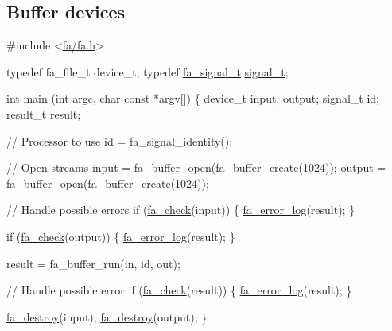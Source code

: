 \hypertarget{md__devices_id11127283}{}\subsection{Buffer devices}\label{md__devices_id11127283}

\begin{DoxyCode}
\textcolor{preprocessor}{#include <\hyperlink{fa_2fa_8h}{fa/fa.h}>}

\textcolor{keyword}{typedef} fa\_file\_t   device\_t;
\textcolor{keyword}{typedef} \hyperlink{group___fa_signal_gac5c72f160cd6e93a6783551627b166e5}{fa\_signal\_t} \hyperlink{util_8h_a4179e0566b0727e21f1fd4b5e6533dee}{signal\_t};

\textcolor{keywordtype}{int} main (\textcolor{keywordtype}{int} argc, \textcolor{keywordtype}{char} \textcolor{keyword}{const} *argv[])
\{
    device\_t    input, output;
    signal\_t    id;
    result\_t    result;

    \textcolor{comment}{// Processor to use}
    \textcolor{keywordtype}{id} = fa\_signal\_identity();

    \textcolor{comment}{// Open streams}
    input   = fa\_buffer\_open(\hyperlink{group___fa_buffer_ga67c4124d193bca81a6e21ec04d9ff832}{fa\_buffer\_create}(1024));
    output  = fa\_buffer\_open(\hyperlink{group___fa_buffer_ga67c4124d193bca81a6e21ec04d9ff832}{fa\_buffer\_create}(1024));

    \textcolor{comment}{// Handle possible errors}
    \textcolor{keywordflow}{if} (\hyperlink{group___fa_gaec61e23c174faf5e5244ae876d264eb5}{fa\_check}(input)) \{
        \hyperlink{group___fa_error_ga466e0539bedb29f68527448ed9ba11bf}{fa\_error\_log}(result);
    \}                                    

    \textcolor{keywordflow}{if} (\hyperlink{group___fa_gaec61e23c174faf5e5244ae876d264eb5}{fa\_check}(output)) \{
        \hyperlink{group___fa_error_ga466e0539bedb29f68527448ed9ba11bf}{fa\_error\_log}(result);
    \}                                    

    result  = fa\_buffer\_run(in, \textcolor{keywordtype}{id}, out);

    \textcolor{comment}{// Handle possible error}
    \textcolor{keywordflow}{if} (\hyperlink{group___fa_gaec61e23c174faf5e5244ae876d264eb5}{fa\_check}(result)) \{
        \hyperlink{group___fa_error_ga466e0539bedb29f68527448ed9ba11bf}{fa\_error\_log}(result);
    \}                                    

    \hyperlink{group___fa_ga6fd6818b190b9e41a3b5f07e78638539}{fa\_destroy}(input);
    \hyperlink{group___fa_ga6fd6818b190b9e41a3b5f07e78638539}{fa\_destroy}(output);
\}
\end{DoxyCode}
 